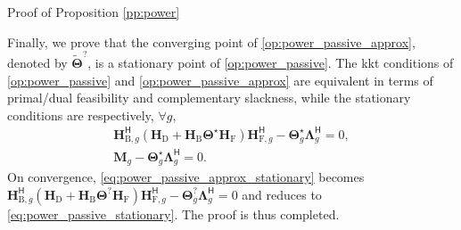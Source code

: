 \begin{appendix}
\begin{subsection}{Proof of Proposition \ref{pp:power}}

Finally, we prove that the converging point of \eqref{op:power_passive_approx}, denoted by $\tilde{\mathbf{\Theta}}^?$, is a stationary point of \eqref{op:power_passive}.
The \gls{kkt} conditions of \eqref{op:power_passive} and \eqref{op:power_passive_approx} are equivalent in terms of primal/dual feasibility and complementary slackness, while the stationary conditions are respectively, $\forall g$,
\begin{gather}
	\mathbf{H}_{\mathrm{B},g}^\mathsf{H} (\mathbf{H}_\mathrm{D} + \mathbf{H}_\mathrm{B} \mathbf{\Theta}^\star \mathbf{H}_\mathrm{F}) \mathbf{H}_{\mathrm{F},g}^\mathsf{H} - \mathbf{\Theta}_g^\star \mathbf{\Lambda}_g^\mathsf{H} = 0,\label{eq:power_passive_stationary}\\
	\mathbf{M}_g - \mathbf{\Theta}_g^\star \mathbf{\Lambda}_g^\mathsf{H} = 0.\label{eq:power_passive_approx_stationary}
\end{gather}
On convergence, \eqref{eq:power_passive_approx_stationary} becomes $\mathbf{H}_{\mathrm{B},g}^\mathsf{H} (\mathbf{H}_\mathrm{D} + \mathbf{H}_\mathrm{B} \mathbf{\Theta}^? \mathbf{H}_\mathrm{F}) \mathbf{H}_{\mathrm{F},g}^\mathsf{H} - \mathbf{\Theta}_g^? \mathbf{\Lambda}_g^\mathsf{H} = 0$ and reduces to \eqref{eq:power_passive_stationary}.
The proof is thus completed.
\end{subsection}



\end{appendix}
